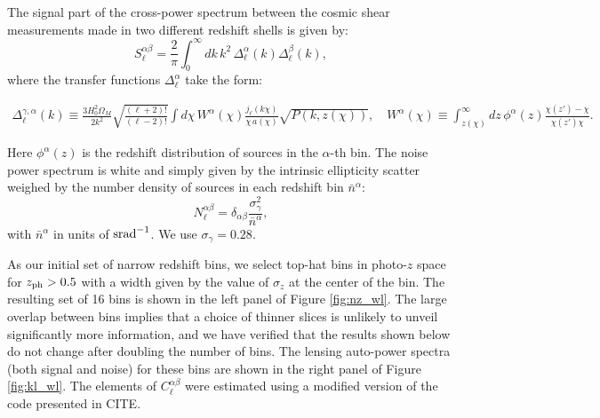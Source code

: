 \documentclass[twocolumn,amsfont,amssymb,amsmath, showpacs,balancelastpage, nofootinbib]{revtex4-1}
\begin{document}
    The signal part of the cross-power spectrum between the cosmic shear measurements made in two different redshift shells is given by:
    \begin{equation}
      S^{\alpha\beta}_\ell=\frac{2}{\pi}\int_0^\infty dk\,k^2\,\Delta^\alpha_\ell(k)\Delta^\beta_\ell(k),
    \end{equation}
    where the transfer functions $\Delta^{\alpha}_\ell$ take the form:
    \begin{widetext}
    \begin{align}
      \Delta^{\gamma,\alpha}_\ell(k)\equiv\frac{3H_0^2\Omega_M}{2k^2}\sqrt{\frac{(\ell+2)!}{(\ell-2)!}}\int d\chi\,W^\alpha(\chi)\frac{j_\ell(k\chi)}{\chi\,a(\chi)}\sqrt{P(k,z(\chi))},\hspace{12pt}
      W^\alpha(\chi)\equiv\int_{z(\chi)}^\infty dz\,\phi^\alpha(z)\frac{\chi(z')-\chi}{\chi(z')\chi}.
    \end{align}
    \end{widetext}
    Here $\phi^\alpha(z)$ is the redshift distribution of sources in the $\alpha$-th bin. The noise power spectrum is white and simply given by the intrinsic ellipticity scatter weighed by the number density of sources in each redshift bin $\bar{n}^\alpha$:
    \begin{equation}
      N^{\alpha\beta}_\ell=\delta_{\alpha\beta}\frac{\sigma_\gamma^2}{\bar{n}^\alpha},
    \end{equation}
    with $\bar{n}^\alpha$ in units of ${\rm srad}^{-1}$. We use $\sigma_\gamma=0.28$.
    
    As our initial set of narrow redshift bins, we select top-hat bins in photo-$z$ space for $z_{\rm ph}>0.5$ with a width given by the value of $\sigma_z$ at the center of the bin. The resulting set of 16 bins is shown in the left panel of Figure \ref{fig:nz_wl}. The large overlap between bins implies that a choice of thinner slices is unlikely to unveil significantly more information, and we have verified that the results shown below do not change after doubling the number of bins. The lensing auto-power spectra (both signal and noise) for these bins are shown in the right panel of Figure \ref{fig:kl_wl}. The elements of $C^{\alpha\beta}_\ell$ were estimated using a modified version of the code presented in CITE.
    
\end{document}
